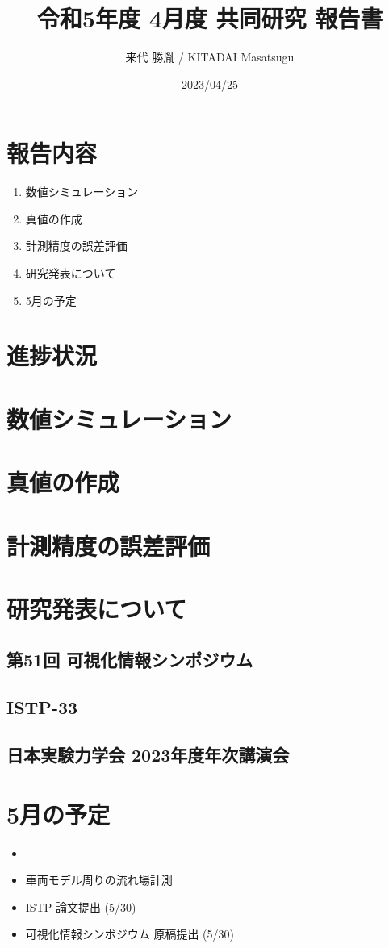 \documentclass[twocolumn,a4j]{jsarticle}
\author{来代 勝胤 / KITADAI Masatsugu}
\title{令和5年度 4月度 共同研究 報告書}
\date{2023/04/25}
\begin{document}
\columnseprule=0.1mm
\maketitle

\section*{報告内容}
\begin{enumerate}[1.]
    \item 数値シミュレーション
    \item 真値の作成
    \item 計測精度の誤差評価
    \item 研究発表について
    \item 5月の予定
\end{enumerate}
\section*{進捗状況}

\section{数値シミュレーション}


\section{真値の作成}


\section{計測精度の誤差評価}


\section{研究発表について}

\subsection{第51回 可視化情報シンポジウム}
\subsection{ISTP-33}
\subsection{日本実験力学会 2023年度年次講演会}


\section{5月の予定}
\begin{itemize}
    \item
    \item 車両モデル周りの流れ場計測
    \item ISTP 論文提出 (5/30)
    \item 可視化情報シンポジウム 原稿提出 (5/30)
\end{itemize}
\end{document}
